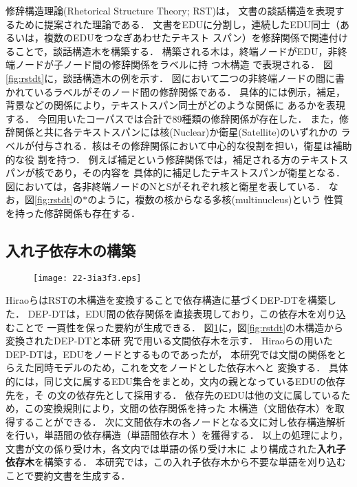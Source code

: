 \documentclass[japanese]{jnlp_1.4}
\begin{document}
修辞構造理論(Rhetorical Structure Theory; RST)\cite{mann:88}は，
文書の談話構造を表現するために提案された理論である．
文書をEDUに分割し，連続したEDU同士（あるいは，複数のEDUをつなぎあわせたテキスト
スパン）を修辞関係で関連付けることで，談話構造木を構築する．
構築される木は，終端ノードがEDU，非終端ノードが子ノード間の修辞関係をラベルに持
つ木構造
で表現される．
図\ref{fig:rstdt}に，談話構造木の例を示す．
図において二つの非終端ノードの間に書かれているラベルがそのノード間の修辞関係である．
具体的には例示，補足，背景などの関係により，テキストスパン同士がどのような関係に
あるかを表現する．
今回用いたコーパスでは合計で89種類の修辞関係が存在した．
また，修辞関係と共に各テキストスパンには核(Nuclear)か衛星(Satellite)のいずれかの
ラベルが付与される．核はその修辞関係において中心的な役割を担い，衛星は補助的な役
割を持つ．
例えば補足という修辞関係では，補足される方のテキストスパンが核であり，その内容を
具体的に補足したテキストスパンが衛星となる．
図においては，各非終端ノードのNとSがそれぞれ核と衛星を表している．
なお，図\ref{fig:rstdt}の$\ast$のように，複数の核からなる多核(multinucleus)という
性質を持った修辞関係も存在する．



\subsection{入れ子依存木の構築}
\label{sec:build_tree}

\begin{figure}[b]
\begin{center}
\texttt{[image: 22-3ia3f3.eps]}
\end{center}
\label{fig:deptrees}
\end{figure}

Hiraoら\cite{hirao:13}はRSTの木構造を変換することで依存構造に基づくDEP-DTを構築した．
DEP-DTは，EDU間の依存関係を直接表現しており，この依存木を刈り込むことで
一貫性を保った要約が生成できる．
図\ref{fig:deptrees}に，図\ref{fig:rstdt}の木構造から変換されたDEP-DTと本研
究で用いる文間依存木を示す．
Hiraoらの用いたDEP-DTは，EDUをノードとするものであったが，
本研究では文間の関係をとらえた同時モデルのため，これを文をノードとした依存木へと
変換する．
具体的には，同じ文に属するEDU集合をまとめ，文内の親となっているEDUの依存先を，そ
の文の依存先として採用する．
依存先のEDUは他の文に属しているため，この変換規則により，文間の依存関係を持った
木構造（文間依存木）を取得することができる．
次に文間依存木の各ノードとなる文に対し依存構造解析を行い，単語間の依存構造（単語間依存木
）を獲得する．
以上の処理により，文書が文の係り受け木，各文内では単語の係り受け木に
より構成された{\bf 入れ子依存木}を構築する．
本研究では，この入れ子依存木から不要な単語を刈り込むことで要約文書を生成する．
\end{document}
